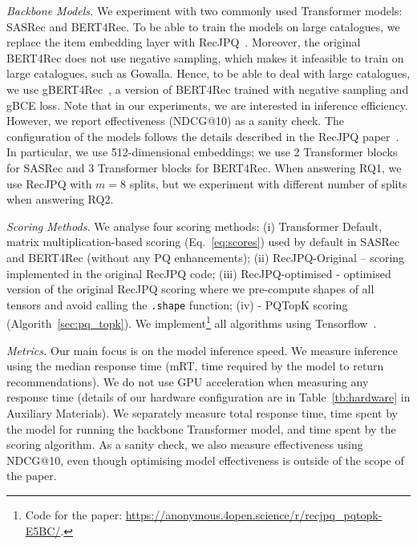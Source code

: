 \documentclass[sigconf,natbib=true, review=true]{acmart} %
\newcommand{\rsasha}[1]{\textcolor[HTML]{FF0000}{#1}}
\begin{document}
\textit{Backbone Models.} We experiment with two commonly used Transformer models: SASRec and BERT4Rec. To be able to train the models on large catalogues, we replace the item embedding layer with RecJPQ~\cite{petrovRecJPQTrainingLargeCatalogue2024}. Moreover, the original BERT4Rec does not use negative sampling, which makes it infeasible to train on large catalogues, such as Gowalla. Hence, to be able to deal with large catalogues, we use gBERT4Rec~\cite{petrovGSASRecReducingOverconfidence2023}, a version of BERT4Rec trained with negative sampling and gBCE loss. Note that in our experiments, we are interested in inference efficiency. However, we report effectiveness (NDCG@10) as a sanity check. The configuration of the models follows the details described in the RecJPQ paper~\cite{petrovRecJPQTrainingLargeCatalogue2024}. In particular, we use 512-dimensional embeddings;  we use 2 Transformer blocks for SASRec and 3 Transformer blocks for BERT4Rec. When answering RQ1, we use RecJPQ with $m=8$ splits, but we experiment with different number of splits when answering RQ2. 

\textit{Scoring Methods.} We analyse four scoring methods: (i) Transformer Default,  matrix multiplication-based scoring (Eq.~\eqref{eq:scores}) used by default in SASRec and BERT4Rec \rsasha{(without any PQ enhancements)}; (ii) RecJPQ-Original -- scoring implemented in the original RecJPQ code; (iii) RecJPQ-optimised - optimised version of the original RecJPQ scoring where \rsasha{we pre-compute shapes of all tensors and avoid calling the \texttt{.shape} function}; (iv) - PQTopK scoring (Algorith~\ref{sec:pq_topk}). We implement\footnote{\rsasha{Code for the paper: \href{https://anonymous.4open.science/r/recjpq\_pqtopk-E5BC/}{https://anonymous.4open.science/r/recjpq\_pqtopk-E5BC/}}.} all algorithms using Tensorflow~\cite{abadiTensorFlowSystemLargeScale2016}. 

\textit{Metrics.} Our main focus is on the model inference speed. We measure inference using the median response time (mRT, time required by the model to return recommendations). We do not use GPU acceleration when measuring any response time \rsasha{(details of our hardware configuration are in Table~\ref{tb:hardware} in Auxiliary Materials)}.  We separately measure total response time, time spent by the model for running the backbone Transformer model, and time spent by the scoring algorithm. As a sanity check, we also measure effectiveness using NDCG@10, even though optimising model effectiveness is outside of the scope of the paper. 
\end{document}
